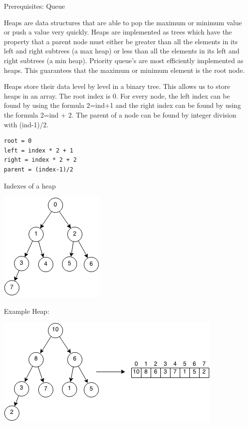 \documentclass[11pt,oneside]{book}
\makeatletter
\def\maxwidth#1{\ifdim\Gin@nat@width>#1 #1\else\Gin@nat@width\fi}
\makeatother
\begin{document}
Prerequisites: Queue



Heaps are data structures that are able to pop the maximum or minimum value or push a value very quickly. Heaps are implemented as trees which have the property that a parent node must either be greater than all the elements in its left and right subtrees (a max heap) or less than all the elements in its left and right subtrees (a min heap). Priority queue's are most efficiently implemented as heaps. This guarantees that the maximum or minimum element is the root node.

Heaps store their data level by level in a binary tree. This allows us to store heaps in an array. The root index is 0. For every node, the left index can be found by using the formula 2=ind+1 and the right index can be found by using the formula 2=ind + 2. The parent of a node can be found by integer division with (ind-1)/2.

\begin{lstlisting}
root = 0
left = index * 2 + 1
right = index * 2 + 2
parent = (index-1)/2
\end{lstlisting}

Indexes of a heap

\includegraphics[width=\maxwidth{\textwidth}]{maxheap2.png}

Example Heap:

\includegraphics[width=\maxwidth{\textwidth}]{maxheap.png}
\end{document}
